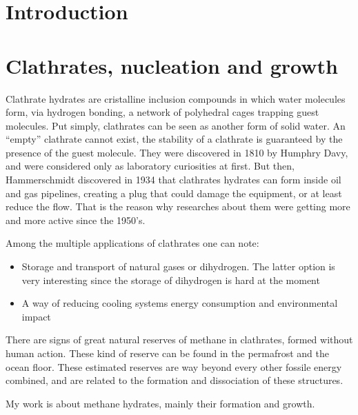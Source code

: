 \newpage
\section{Introduction}

\section{Clathrates, nucleation and growth}

Clathrate hydrates are cristalline inclusion compounds in which water molecules form, via hydrogen bonding, a network of polyhedral cages trapping guest molecules. Put simply, clathrates can be seen as another form of solid water. An ``empty'' clathrate cannot exist, the stability of a clathrate is guaranteed by the presence of the guest molecule. They were discovered in 1810 by Humphry Davy, and were considered only as laboratory curiosities at first. But then, Hammerschmidt discovered in 1934 that clathrates hydrates can form inside oil and gas pipelines, creating a plug that could damage the equipment, or at least reduce the flow. That is the reason why researches about them were getting more and more active since the 1950's.

Among the multiple applications of clathrates one can note:
\begin{itemize}
    \item Storage and transport of natural gases or dihydrogen. The latter option is very interesting since the storage of dihydrogen is hard at the moment
    \item A way of reducing cooling systems energy consumption and environmental impact
\end{itemize}

There are signs of great natural reserves of methane in clathrates, formed without human action. These kind of reserve can be found in the permafrost and the ocean floor. These estimated reserves are way beyond every other fossile energy combined, and are related to the formation and dissociation of these structures.

My work is about methane hydrates, mainly their formation and growth.

